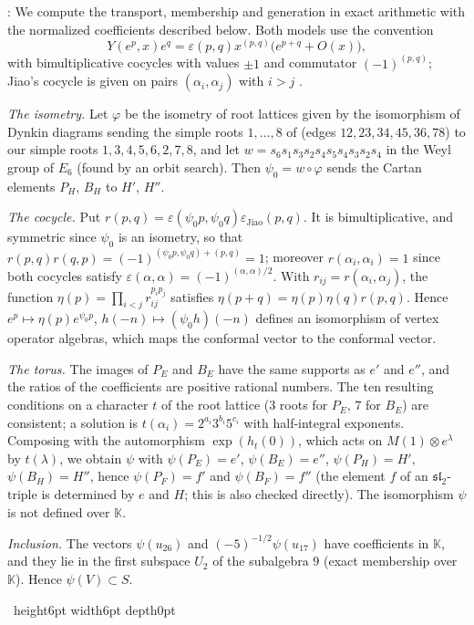 \documentclass[leqno]{article}
\newcommand{\K}{\ensuremath{\mathbb{K}}}
\newcommand{\qed}{\hfill \vrule height6pt  width6pt depth0pt}
\newcommand{\ot}{\otimes}
\newcommand{\epsi}{\varepsilon}
\newenvironment{proof}[1][]{\noindent {\it Proof #1} : }{\hbox{~}\qed
\smallskip
}
\numberwithin{equation}{section}
\begin{document}
\begin{proof}
We compute the transport, membership and generation in exact arithmetic with the normalized coefficients described below. Both models use the convention
\[
Y(e^p,x)e^q = \epsi(p,q) x^{(p,q)}\big(e^{p+q} + O(x)\big),
\]
with bimultiplicative cocycles with values $\pm 1$ and commutator $(-1)^{(p,q)}$; Jiao's cocycle is given on pairs $(\alpha_i,\alpha_j)$ with $i > j$ \cite[Section 3.1]{Jia26}.

\emph{The isometry.} Let $\varphi$ be the isometry of root lattices given by the isomorphism of Dynkin diagrams sending the simple roots $1,\ldots,8$ of \cite{Jia26} (edges $12, 23, 34, 45, 36, 78$) to our simple roots $1,3,4,5,6,2,7,8$, and let $w = s_6s_1s_3s_2s_4s_5s_4s_3s_2s_4$ in the Weyl group of $E_6$ (found by an orbit search). Then $\psi_0 = w \circ \varphi$ sends the Cartan elements $P_H$, $B_H$ to $H'$, $H''$.

\emph{The cocycle.} Put $r(p,q) = \epsi(\psi_0p,\psi_0q) \epsi_{\mathrm{Jiao}}(p,q)$. It is bimultiplicative, and symmetric since $\psi_0$ is an isometry, so that $r(p,q)r(q,p) = (-1)^{(\psi_0p,\psi_0q)+(p,q)} = 1$; moreover $r(\alpha_i,\alpha_i) = 1$ since both cocycles satisfy $\epsi(\alpha,\alpha) = (-1)^{(\alpha,\alpha)/2}$. With $r_{ij} = r(\alpha_i,\alpha_j)$, the function $\eta(p) = \prod_{i<j} r_{ij}^{p_ip_j}$ satisfies $\eta(p+q) = \eta(p)\eta(q)r(p,q)$. Hence $e^p \mapsto \eta(p)e^{\psi_0p}$, $h(-n) \mapsto (\psi_0h)(-n)$ defines an isomorphism of vertex operator algebras, which maps the conformal vector to the conformal vector.

\emph{The torus.} The images of $P_E$ and $B_E$ have the same supports as $e'$ and $e''$, and the ratios of the coefficients are positive rational numbers. The ten resulting conditions on a character $t$ of the root lattice ($3$ roots for $P_E$, $7$ for $B_E$) are consistent; a solution is $t(\alpha_i) = 2^{a_i}3^{b_i}5^{c_i}$ with half-integral exponents. Composing with the automorphism $\exp(h_t(0))$, which acts on $M(1) \ot e^\lambda$ by $t(\lambda)$, we obtain $\psi$ with $\psi(P_E) = e'$, $\psi(B_E) = e''$, $\psi(P_H) = H'$, $\psi(B_H) = H''$, hence $\psi(P_F) = f'$ and $\psi(B_F) = f''$ (the element $f$ of an $\mathfrak{sl}_2$-triple is determined by $e$ and $H$; this is also checked directly). The isomorphism $\psi$ is not defined over $\K$.

\emph{Inclusion.} The vectors $\psi(u_{26})$ and $(-5)^{-1/2}\psi(u_{17})$ have coefficients in $\K$, and they lie in the first subspace $U_2$ of the subalgebra $9$ (exact membership over $\K$). Hence $\psi(V) \subset S$.


\end{proof}
\end{document}
